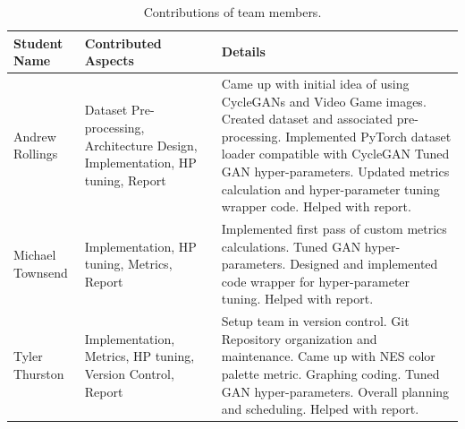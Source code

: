 \documentclass[10pt,twocolumn,letterpaper]{article}
\begin{document}
\newpage
\begin{table}
   \begin{center}
      \begin{tabular}{|p{3cm}|p{5.5cm}|p{8.5cm}|}
         \hline
         \textbf{Student Name} & \textbf{Contributed Aspects}                                                   & \textbf{Details}                                                                                                                                                                                                                                                                                    \\
         \hline\hline
         Andrew Rollings       & Dataset Pre-processing, Architecture Design, Implementation, HP tuning, Report & Came up with initial idea of using CycleGANs and Video Game images. Created dataset and associated pre-processing. Implemented PyTorch dataset loader compatible with CycleGAN Tuned GAN hyper-parameters. Updated metrics calculation and hyper-parameter tuning wrapper code. Helped with report. \\
         \hline
         Michael Townsend      & Implementation, HP tuning, Metrics, Report                                     & Implemented first pass of custom metrics calculations. Tuned GAN hyper-parameters. Designed and implemented code wrapper for hyper-parameter tuning. Helped with report.                                                                                                                            \\
         \hline
         Tyler Thurston        & Implementation, Metrics, HP tuning, Version Control, Report                    & Setup team in version control. Git Repository organization and maintenance. Came up with NES color palette metric. Graphing coding. Tuned GAN hyper-parameters. Overall planning and scheduling. Helped with report.                                                                                \\
         \hline
      \end{tabular}
   \end{center}
   \caption{Contributions of team members.}
   \label{tab:contributions}
\end{table}
\end{document}
